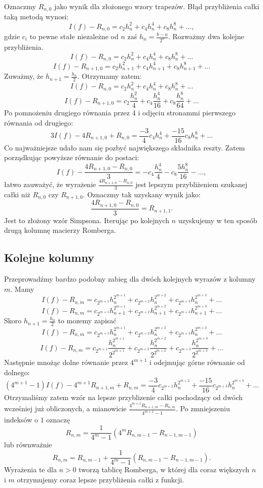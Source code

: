 \documentclass[a4paper,12pt]{article}
\begin{document}
Oznaczmy $R_{n, 0}$ jako wynik dla złożonego wzory trapezów. Błąd przybliżenia całki taką metodą wynosi:
$$I(f) - R_{n, 0} = c_2h_n^2 + c_4h_n^4 + c_8h_n^8 + \dots, $$
gdzie $c_i$ to pewne stałe niezależne od $n$ zaś $h_n = \frac{b-a}{2^n}$.
Rozważmy dwa kolejne przybliżenia.
$$I(f) - R_{n, 0} = c_2h_n^2 + c_4h_n^4 + c_8h_n^8 + \dots $$
$$I(f) - R_{n+1, 0} = c_2h_{n+1}^2 + c_4h_{n+1}^4 + c_8h_{n+1}^8 + \dots $$
Zuważmy, że $h_{n+1} = \frac{h_n}{2}$. Otrzymamy zatem:
$$I(f) - R_{n, 0} = c_2h_n^2 + c_4h_n^4 + c_8h_n^8 + \dots $$
$$I(f) - R_{n+1, 0} = c_2\frac{h_n^2}{4} + c_4\frac{h_n^4}{16} + c_8\frac{h_n^8}{64} + \dots $$
Po pomnożeniu drugiego równania przez $4$ i odjęciu stronammi pierwszego równania od drugiego:
$$ 3I(f) - 4R_{n+1, 0} + R_{n, 0} = \frac{-3}{4}c_4h_n^4 + \frac{-15}{16}c_8h_n^8 + \dots$$
Co najważniejsze udało nam się pozbyć największego składnika reszty. Zatem porządkując powyższe równanie do postaci:
$$I(f) - \frac{4R_{n+1, 0} - R_{n, 0}}{3} = -c_4\frac{h_n^4}{4} - c_8\frac{5h_n^8}{16} - \dots, $$
łatwo zauważyć, że wyrażenie $ \frac{4R_{n+1, 0} - R_{n, 0}}{3} $ jest lepszym przybliżeniem szukanej całki niż $R_{n, 0}$ czy $R_{n+1, 0}$. Oznaczmy tak uzyskany wynik jako:
$$ \frac{4R_{n+1, 0} - R_{n, 0}}{3} = R_{n+1, 1}. $$
Jest to złożony wzór Simpsona. Iterując po kolejnych $n$ uzyskujemy w ten sposób drugą kolumnę macierzy Romberga.

\subsection{Kolejne kolumny}
Przeprowadźmy bardzo podobny zabieg dla dwóch kolejnych wyrazów z kolumny $m$. Mamy
$$I(f) - R_{n, m} = c_{2^{m+1}}h_n^{2^{m+1}} + c_{2^{m+2}}h_n^{2^{m+2}} + c_{2^{m+3}}h_n^{2^{m+3}} + \dots $$
$$I(f) - R_{n, m} = c_{2^{m+1}}h_{n+1}^{2^{m+1}} + c_{2^{m+2}}h_{n+1}^{2^{m+2}} + c_{2^{m+3}}h_{n+1}^{2^{m+3}} + \dots $$
Skoro $h_{n+1} = \frac{h_n}{2}$ to mozemy zapisać
$$I(f) - R_{n, m} = c_{2^{m+1}}h_n^{2^{m+1}} + c_{2^{m+2}}h_n^{2^{m+2}} + c_{2^{m+3}}h_n^{2^{m+3}} + \dots $$
$$I(f) - R_{n, m} = c_{2^{m+1}}\frac{h_n^{2^{m+1}}}{2^{2^{m+1}}} + c_{2^{m+2}}\frac{h_n^{2^{m+2}}}{2^{2^{m+2}}} + c_{2^{m+3}}\frac{h_n^{2^{m+3}}}{2^{2^{m+3}}} + \dots $$
Następnie mnożąc dolne równanie przez $4^{m+1}$ i odejmując górne równanie od dolnego:
$$ (4^{m+1} - 1) I(f) - 4^{m+1}R_{n+1, m} + R_{n, m} = \frac{-3}{4}c_{2^{m+2}}h_n^{2^{m+2}} + \frac{-15}{16}c_{2^{m+3}}h_n^{2^{m+3}} + \dots $$
Otrzymaliśmy zatem wzór na lepsze przyblizenie całki pochodzący od dwóch wcześniej już obliczonych, a mianowicie $ \frac{4^{m+1}R_{n+1, m} - R_{n, m}}{4^{m+1}-1}$. Po zmniejszeniu indeksów o $1$ oznaczę
$$ R_{n, m} = \frac{1}{4^m - 1}(4^mR_{n, m-1} - R_{n-1, m-1}) $$
lub równważnie
$$ R_{n, m} = R_{n, m-1} + \frac{1}{4^m - 1}(R_{n, m-1} - R_{n-1, m-1}).$$
Wyrażenia te dla $n>0$ tworzą tablicę Romberga, w której dla coraz większych $n$ i $m$ otrzymujemy coraz lepsze przybliżenia całki z funkcji.
\end{document}
